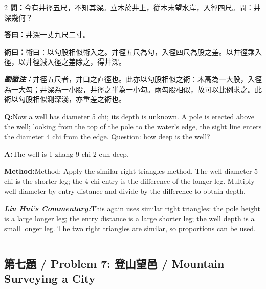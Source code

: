 \documentclass[11pt,a4paper]{article}
\newcommand{\cnwen}{\textcolor{cnlabelfg}{\textbf{問：}}}
\newcommand{\cnda}{\textbf{答曰：}}
\newcommand{\cnshu}{\textcolor{cnlabelfg}{\textbf{術曰：}}}
\newcommand{\cnzhu}{\textcolor{commentarycolor}{\textit{\textbf{劉徽注：}}}}
\newcommand{\enwen}{\textcolor{enlabelfg}{\textbf{Q:}}}
\newcommand{\enda}{\textcolor{enlabelfg}{\textbf{A:}}}
\newcommand{\enshu}{\textcolor{enlabelfg}{\textbf{Method:}}}
\newcommand{\enzhu}{\textcolor{enlabelfg}{\textit{\textbf{Liu Hui's Commentary:}}}}
\begin{document}
\begin{paracol}{2}
\switchcolumn[0]
\cnwen 今有井徑五尺，不知其深。立木於井上，從木末望水岸，入徑四尺。問：井深幾何？

\cnda 井深一丈九尺二寸。

\cnshu 術曰：以勾股相似術入之。井徑五尺為勾，入徑四尺為股之差。以井徑乘入徑，以井徑減入徑之差除之，得井深。

\cnzhu 井徑五尺者，井口之直徑也。此亦以勾股相似之術：木高為一大股，入徑為一大勾；井深為一小股，井徑之半為一小勾。兩勾股相似，故可以比例求之。此術以勾股相似測深淺，亦重差之術也。

\switchcolumn[1]
\enwen Now a well has diameter 5 chi; its depth is unknown. A pole is erected above the well; looking from the top of the pole to the water's edge, the sight line enters the diameter 4 chi from the edge. Question: how deep is the well?

\enda The well is 1 zhang 9 chi 2 cun deep.

\enshu Method: Apply the similar right triangles method. The well diameter 5 chi is the shorter leg; the 4 chi entry is the difference of the longer leg. Multiply well diameter by entry distance and divide by the difference to obtain depth.

\enzhu This again uses similar right triangles: the pole height is a large longer leg; the entry distance is a large shorter leg; the well depth is a small longer leg. The two right triangles are similar, so proportions can be used.
\end{paracol}

\bigskip\hrule\bigskip

\subsection{第七題 / Problem 7: 登山望邑 / Mountain Surveying a City}
\end{document}
